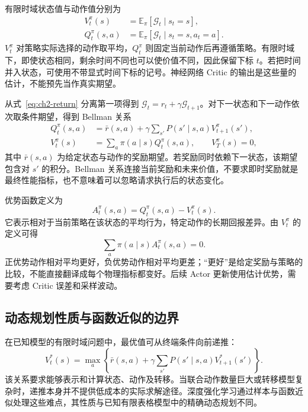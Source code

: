有限时域状态值与动作值分别为
\begin{align}
    V_t^\pi(s)&=\mathbb E_\pi[\mathcal G_t\mid s_t=s],
    \label{eq:ch2-state-value}\\
    Q_t^\pi(s,a)&=\mathbb E_\pi[\mathcal G_t\mid s_t=s,a_t=a].
    \label{eq:ch2-action-value}
\end{align}
$V_t^\pi$ 对策略实际选择的动作取平均，$Q_t^\pi$ 则固定当前动作后再遵循策略。有限时域下，即使状态相同，剩余时间不同也可以使价值不同，因此保留下标 $t$。若把时间并入状态，可使用不带显式时间下标的记号。神经网络 Critic 的输出是这些量的估计，不能预先当作真实期望。

从式~\eqref{eq:ch2-return} 分离第一项得到 $\mathcal G_t=r_t+\gamma\mathcal G_{t+1}$。对下一状态和下一动作依次取条件期望，得到 Bellman 关系
\begin{align}
    Q_t^\pi(s,a)&=\bar r(s,a)+\gamma\sum_{s'}P(s'\mid s,a)V_{t+1}^\pi(s'),
    \label{eq:ch2-bellman-q}\\
    V_t^\pi(s)&=\sum_a\pi(a\mid s)Q_t^\pi(s,a),
    \qquad V_T^\pi(s)=0,
    \label{eq:ch2-bellman-v}
\end{align}
其中 $\bar r(s,a)$ 为给定状态与动作的奖励期望。若奖励同时依赖下一状态，该期望包含对 $s'$ 的积分。Bellman 关系连接当前奖励和未来价值，不要求即时奖励就是最终性能指标，也不意味着可以忽略请求执行后的状态变化。

优势函数定义为
\begin{equation}
    A_t^\pi(s,a)=Q_t^\pi(s,a)-V_t^\pi(s).
    \label{eq:ch2-advantage}
\end{equation}
它表示相对于当前策略在该状态的平均行为，特定动作的长期回报差异。由 $V_t^\pi$ 的定义可得
\begin{equation}
    \sum_a\pi(a\mid s)A_t^\pi(s,a)=0.
    \label{eq:ch2-advantage-zero}
\end{equation}
正优势动作相对平均更好，负优势动作相对平均更差；“更好”是给定奖励与策略的比较，不能直接翻译成每个物理指标都变好。后续 Actor 更新使用估计优势，需要考虑 Critic 误差和采样波动。

\subsection{动态规划性质与函数近似的边界}
\label{sec:ch2-bellman-boundary}

在已知模型的有限时域问题中，最优值可从终端条件向前递推：
\begin{equation}
    V_t^*(s)=\max_a\left\{\bar r(s,a)+\gamma\sum_{s'}P(s'\mid s,a)V_{t+1}^*(s')\right\}.
    \label{eq:ch2-bellman-optimal}
\end{equation}
该关系要求能够表示和计算状态、动作及转移。当联合动作数量巨大或转移模型复杂时，递推本身并不提供低成本的实际求解途径。深度强化学习通过样本与函数近似处理这些难点，其性质与已知有限表格模型中的精确动态规划不同。

